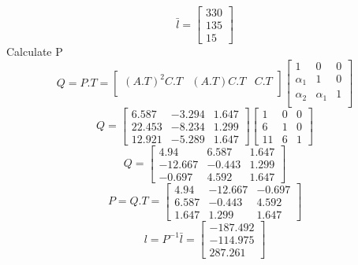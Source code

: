 \begin{enumerate}
\begin{equation}
\end{equation}
\begin{equation}
  \bar l = \left[\begin{matrix}330\\135\\15\end{matrix}\right]
\end{equation}
Calculate P
\begin{equation}
 Q = P.T = 
  \begin{bmatrix}
    (A.T)^2C.T & (A.T)C.T & C.T\\
  \end{bmatrix}
  \begin{bmatrix}
    1 & 0 & 0 \\
    \alpha_1 & 1 & 0 \\
    \alpha_2 & \alpha_1 & 1 \\
  \end{bmatrix}
\end{equation}\begin{equation}
  Q = \left[\begin{matrix}6.587 & -3.294 & 1.647\\22.453 & -8.234 & 1.299\\12.921 & -5.289 & 1.647\end{matrix}\right]\left[\begin{matrix}1 & 0 & 0\\6 & 1 & 0\\11 & 6 & 1\end{matrix}\right]
\end{equation}
\begin{equation}
  Q = \left[\begin{matrix}4.94 & 6.587 & 1.647\\-12.667 & -0.443 & 1.299\\-0.697 & 4.592 & 1.647\end{matrix}\right]
\end{equation}
\begin{equation}
  P = Q.T = \left[\begin{matrix}4.94 & -12.667 & -0.697\\6.587 & -0.443 & 4.592\\1.647 & 1.299 & 1.647\end{matrix}\right]
\end{equation}
\begin{equation}
  l = P^{-1} \bar l  = \left[\begin{matrix}-187.492\\-114.975\\287.261\end{matrix}\right]

\end{equation}
\end{enumerate}
